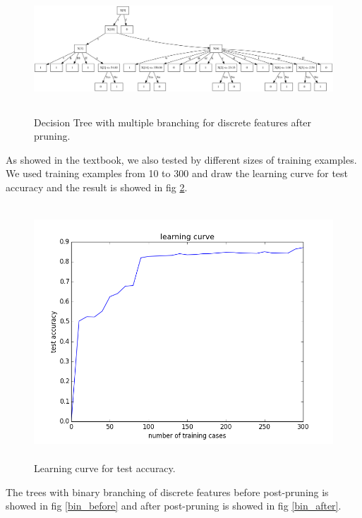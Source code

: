 \documentclass[11pt]{article}
\begin{document}
\begin{figure}[h!]
\centering
\includegraphics[height=1.875in, width=6.5in]{after.png}
\caption{Decision Tree with multiple branching for discrete features after pruning.}
\label{after}
\end{figure}

As showed in the textbook, we also tested by different sizes of training examples. We used training examples from 10 to 300
and draw the learning curve for test accuracy and the result is showed in fig \ref{learn}.

\begin{figure}[h!]
\centering
\includegraphics[height=3.75in, width=5in]{learn.png}
\caption{Learning curve for test accuracy.}
\label{learn}
\end{figure}

The trees with binary branching of discrete features before post-pruning is showed in fig \ref{bin_before} and after post-pruning is showed in fig \ref{bin_after}.
\end{document}
